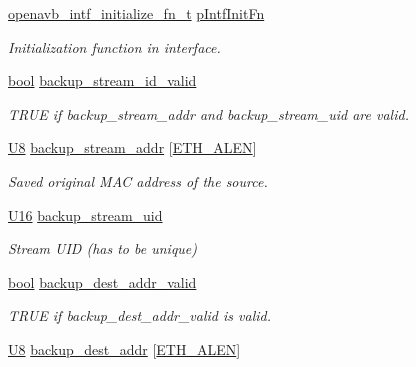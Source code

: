 \begin{DoxyCompactItemize}
\hyperlink{include_2openavb__intf__pub_8h_a2bde5c2d1eb5961fcf50c822093865bb}{openavb\+\_\+intf\+\_\+initialize\+\_\+fn\+\_\+t} \hyperlink{structopenavb__tl__cfg__t_a1e93bc0d2fd6ea831a182dae7b7db6ac}{p\+Intf\+Init\+Fn}
\begin{DoxyCompactList}\small\item\em Initialization function in interface. \end{DoxyCompactList}\item 
\hyperlink{avb__gptp_8h_af6a258d8f3ee5206d682d799316314b1}{bool} \hyperlink{structopenavb__tl__cfg__t_ace9ae11a07a223977fbe329b93d1191b}{backup\+\_\+stream\+\_\+id\+\_\+valid}
\begin{DoxyCompactList}\small\item\em T\+R\+UE if backup\+\_\+stream\+\_\+addr and backup\+\_\+stream\+\_\+uid are valid. \end{DoxyCompactList}\item 
\hyperlink{openavb__types__base__pub_8h_aa63ef7b996d5487ce35a5a66601f3e73}{U8} \hyperlink{structopenavb__tl__cfg__t_a286edaef3000edeca172ff0af9c899bf}{backup\+\_\+stream\+\_\+addr} \mbox{[}\hyperlink{avb__avtp_8h_a9822d89774e0d6ddaa06503950130423}{E\+T\+H\+\_\+\+A\+L\+EN}\mbox{]}
\begin{DoxyCompactList}\small\item\em Saved original M\+AC address of the source. \end{DoxyCompactList}\item 
\hyperlink{openavb__types__base__pub_8h_a0a0a322d5fa4a546d293a77ba8b4a71f}{U16} \hyperlink{structopenavb__tl__cfg__t_ad1dc4ed4c6d3ec8f5a278090efd39aeb}{backup\+\_\+stream\+\_\+uid}
\begin{DoxyCompactList}\small\item\em Stream U\+ID (has to be unique) \end{DoxyCompactList}\item 
\hyperlink{avb__gptp_8h_af6a258d8f3ee5206d682d799316314b1}{bool} \hyperlink{structopenavb__tl__cfg__t_a34a2e8da45008a86cef126647be52472}{backup\+\_\+dest\+\_\+addr\+\_\+valid}
\begin{DoxyCompactList}\small\item\em T\+R\+UE if backup\+\_\+dest\+\_\+addr\+\_\+valid is valid. \end{DoxyCompactList}\item 
\hyperlink{openavb__types__base__pub_8h_aa63ef7b996d5487ce35a5a66601f3e73}{U8} \hyperlink{structopenavb__tl__cfg__t_a2a40b6c0030df9a47d98c104cbc6e212}{backup\+\_\+dest\+\_\+addr} \mbox{[}\hyperlink{avb__avtp_8h_a9822d89774e0d6ddaa06503950130423}{E\+T\+H\+\_\+\+A\+L\+EN}\mbox{]}

\end{DoxyCompactItemize}
